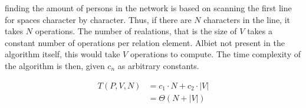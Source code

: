 finding the amount of persons in the network is based on 
scanning the first line for spaces character by character.
Thus, if there are $N$ characters in the line, it takes $N$
operations. The number of realations, that is the size of $V$
takes a constant number of operations per relation element. 
Albiet not present in the algorithm itself, this would take
$V$ operations to compute. The time complexity of the algorithm
is then, given $c_n$ as arbitrary constants.

\begin{align*}
T(P, V, N) &= c_1 \cdot N + c_2 \cdot |V|\\ 
           &= \Theta \left( N + |V| \right)
\end{align*}




